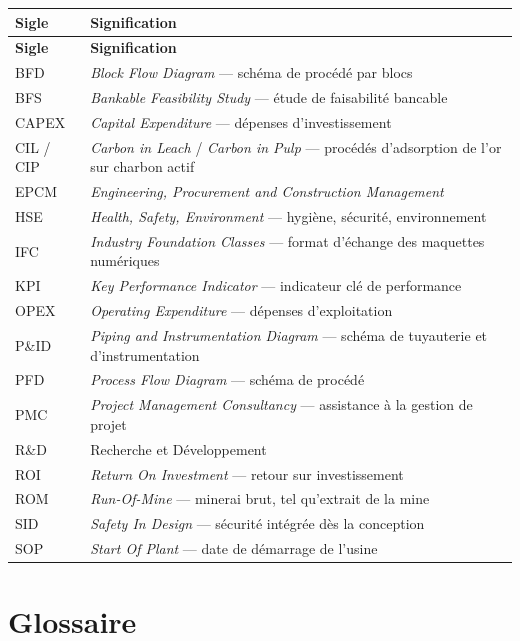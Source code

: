 \documentclass[12pt,a4paper,oneside]{report}
\begin{document}
\begin{longtable}{@{}p{2.8cm} p{11.5cm}@{}}
\toprule
\textbf{Sigle} & \textbf{Signification} \\
\midrule
\endfirsthead
\toprule
\textbf{Sigle} & \textbf{Signification} \\
\midrule
\endhead
\bottomrule
\endfoot
BFD & \textit{Block Flow Diagram} --- schéma de procédé par blocs \\
BFS & \textit{Bankable Feasibility Study} --- étude de faisabilité bancable \\
CAPEX & \textit{Capital Expenditure} --- dépenses d'investissement \\
CIL / CIP & \textit{Carbon in Leach} / \textit{Carbon in Pulp} --- procédés d'adsorption de l'or sur charbon actif \\
EPCM & \textit{Engineering, Procurement and Construction Management} \\
HSE & \textit{Health, Safety, Environment} --- hygiène, sécurité, environnement \\
IFC & \textit{Industry Foundation Classes} --- format d'échange des maquettes numériques \\
KPI & \textit{Key Performance Indicator} --- indicateur clé de performance \\
OPEX & \textit{Operating Expenditure} --- dépenses d'exploitation \\
P\&ID & \textit{Piping and Instrumentation Diagram} --- schéma de tuyauterie et d'instrumentation \\
PFD & \textit{Process Flow Diagram} --- schéma de procédé \\
PMC & \textit{Project Management Consultancy} --- assistance à la gestion de projet \\
R\&D & Recherche et Développement \\
ROI & \textit{Return On Investment} --- retour sur investissement \\
ROM & \textit{Run-Of-Mine} --- minerai brut, tel qu'extrait de la mine \\
SID & \textit{Safety In Design} --- sécurité intégrée dès la conception \\
SOP & \textit{Start Of Plant} --- date de démarrage de l'usine \\
\end{longtable}

\section*{Glossaire}
\end{document}
